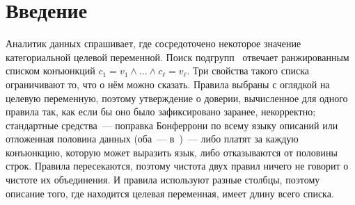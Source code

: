 \documentclass[11pt]{article}
\begin{document}
\section{Введение}

Аналитик данных спрашивает, где сосредоточено некоторое значение категориальной целевой переменной. Поиск подгрупп~\citep{klosgen1996,wrobel1997,atzmueller2015} отвечает ранжированным списком конъюнкций $c_1 = v_1 \wedge \dots \wedge c_\ell = v_\ell$. Три свойства такого списка ограничивают то, что о нём можно сказать. Правила выбраны с оглядкой на целевую переменную, поэтому утверждение о доверии, вычисленное для одного правила так, как если бы оно было зафиксировано заранее, некорректно; стандартные средства~--- поправка Бонферрони по всему языку описаний или отложенная половина данных (оба~--- в~\citealp{webb2007})~--- либо платят за каждую конъюнкцию, которую может выразить язык, либо отказываются от половины строк. Правила пересекаются, поэтому чистота двух правил ничего не говорит о чистоте их объединения. И правила используют разные столбцы, поэтому описание того, где находится целевая переменная, имеет длину всего списка.
\end{document}
